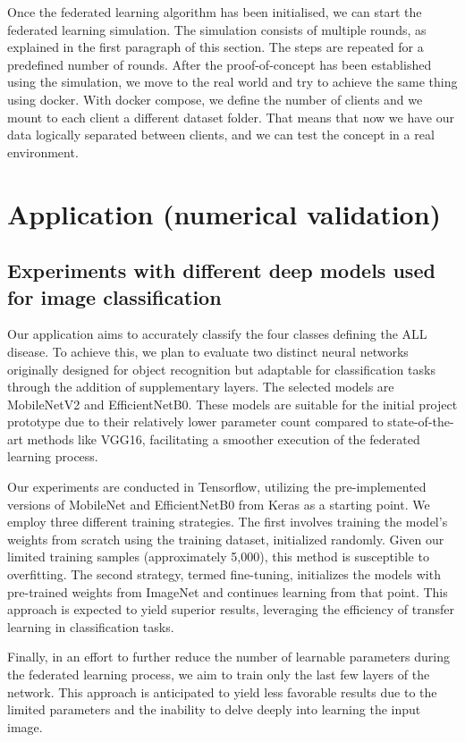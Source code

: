 \documentclass[runningheads,a4paper,11pt]{report}
\begin{document}
Once the federated learning \cite{mcmahan2017communication} algorithm has been initialised, we can start the federated learning simulation. The simulation consists of multiple rounds, as explained in the first paragraph of this section. The steps are repeated for a predefined number of rounds. After the proof-of-concept has been established using the simulation, we move to the real world and try to achieve the same thing using docker. With docker compose, we define the number of clients and we mount to each client a different dataset folder. That means that now we have our data logically separated between clients, and we can test the concept in a real environment.


\chapter{Application (numerical validation)}
\label{chapter:application}

\section{Experiments with different deep models used for image classification}

Our application aims to accurately classify the four classes defining the ALL disease. To achieve this, we plan to evaluate two distinct neural networks originally designed for object recognition but adaptable for classification tasks through the addition of supplementary layers. The selected models are MobileNetV2 and EfficientNetB0. These models are suitable for the initial project prototype due to their relatively lower parameter count compared to state-of-the-art methods like VGG16, facilitating a smoother execution of the federated learning process.

Our experiments are conducted in Tensorflow, utilizing the pre-implemented versions of MobileNet and EfficientNetB0 from Keras as a starting point. We employ three different training strategies. The first involves training the model's weights from scratch using the training dataset, initialized randomly. Given our limited training samples (approximately 5,000), this method is susceptible to overfitting. The second strategy, termed fine-tuning, initializes the models with pre-trained weights from ImageNet and continues learning from that point. This approach is expected to yield superior results, leveraging the efficiency of transfer learning in classification tasks.

Finally, in an effort to further reduce the number of learnable parameters during the federated learning process, we aim to train only the last few layers of the network. This approach is anticipated to yield less favorable results due to the limited parameters and the inability to delve deeply into learning the input image.
\end{document}
